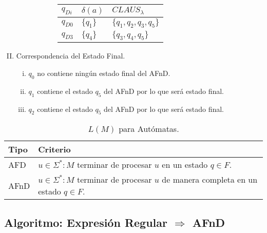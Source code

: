 \begin{enumerate}[I.]
{\begin{figure}[h]
\begin{subfigure}[B]{0.4\textwidth}
\begin{tabular}{l|l|l}
$q_{Di}$ & $\delta (a)$ & $CLAUS_\lambda$ \\ \hline
\hline
$q_{D0}$ & $ \{q_1\}$ & $\{q_1,q_2,q_3,q_5\}$ \\ \hline
$q_{D3}$ & $ \{q_4\}$ & $\{q_3,q_4,q_5\}$ \\ \hline
\end{tabular}
\end{subfigure}
\end{figure}

}
\item Correspondencia del Estado Final.

\begin{enumerate}[i.]

\item $q_0$ no contiene ningún estado final del AFnD.

\item $q_1$ contiene el estado $q_5$ del AFnD por lo que será estado final.

\item $q_2$ contiene el estado $q_5$ del AFnD por lo que será estado final.

\end{enumerate}

\end{enumerate}



\begin{table}[h]

\begin{center}

\begin{tabular}{|l|l|}\hline
\textbf{Tipo} & \textbf{Criterio} \\ \hline
\hline
AFD & $u \in \Sigma^* : M$ terminar de procesar $u$ en un estado $q \in F$. \\ \hline
AFnD & $u \in \Sigma^* : M$ terminar de procesar $u$ de manera completa en un estado $q \in F$. \\ \hline

\end{tabular}

\caption{$L(M)$ para Autómatas.}
\end{center}

\end{table}

\subsection{Algoritmo: Expresión Regular $\Rightarrow$ AFnD}\label{algolER2AFnD}

